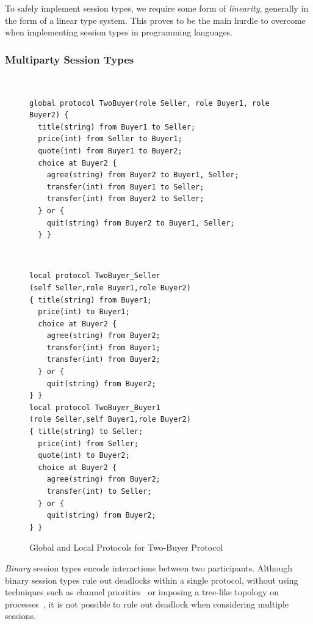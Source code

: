 \documentclass[
graybox,
envcountchap
]{svmult}
\begin{document}
\begin{bibunit}
  To safely implement session types, we require some form of \emph{linearity},
  generally in the form of a linear type system. This proves to be the main
  hurdle to overcome when implementing session types in programming languages.

  \subsubsection{Multiparty Session Types}\label{sec:bt:mpst}

  \begin{figure}
~
\begin{lstlisting}[basicstyle=\scriptsize, language = scribble]
global protocol TwoBuyer(role Seller, role Buyer1, role Buyer2) {
  title(string) from Buyer1 to Seller;
  price(int) from Seller to Buyer1;
  quote(int) from Buyer1 to Buyer2;
  choice at Buyer2 {
    agree(string) from Buyer2 to Buyer1, Seller;
    transfer(int) from Buyer1 to Seller;
    transfer(int) from Buyer2 to Seller;
  } or {
    quit(string) from Buyer2 to Buyer1, Seller;
  } }
\end{lstlisting}%
%
~
\begin{lstlisting}[language = scribble, label={lst:scribble-buy1},multicols=2]
local protocol TwoBuyer_Seller
(self Seller,role Buyer1,role Buyer2)
{ title(string) from Buyer1;
  price(int) to Buyer1;
  choice at Buyer2 {
    agree(string) from Buyer2;
    transfer(int) from Buyer1;
    transfer(int) from Buyer2;
  } or {
    quit(string) from Buyer2;
} }
local protocol TwoBuyer_Buyer1
(role Seller,self Buyer1,role Buyer2)
{ title(string) to Seller;
  price(int) from Seller;
  quote(int) to Buyer2;
  choice at Buyer2 {
    agree(string) from Buyer2;
    transfer(int) to Seller;
  } or {
    quit(string) from Buyer2;
} }
\end{lstlisting}
\caption{Global and Local Protocols for Two-Buyer Protocol}
\label{fig:bt:multiparty}
\end{figure}

\emph{Binary} session types encode interactions between two participants.
Although binary session types rule out deadlocks within a single protocol,
without using techniques such as channel
priorities~\cite{Kobayashi06:df-processes,Padovani14:df-pi,DardhaG18:df-processes}
or imposing a tree-like topology on
processes~\cite{CairesP10:logic,Wadler14:prop-sessions,LindleyM15:semantics}, it
is not possible to rule out deadlock when considering multiple sessions.


\end{bibunit}
\end{document}
